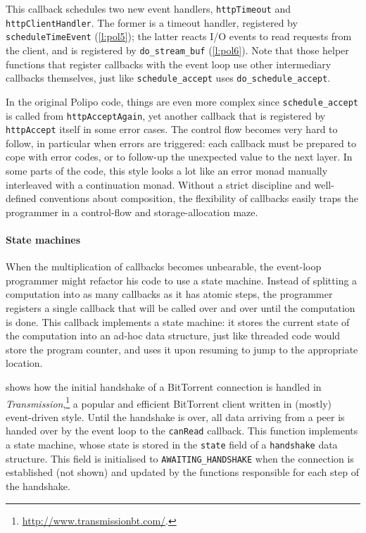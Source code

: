 \documentclass[a4paper]{llncs}
\begin{document}
This callback schedules two new event handlers, \texttt{httpTimeout} and
\texttt{http\-Client\-Handler}.  The former is a timeout handler, registered by
\texttt{schedule\-Time\-Event} (\cref{l:pol5}); the latter reacts I/O events to read requests
from the client, and is registered by \texttt{do\_stream\_buf} (\cref{l:pol6}).  Note that
those helper functions that register callbacks with the event loop use other
intermediary callbacks themselves, just like \texttt{schedule\_accept} uses
\texttt{do\_schedule\_accept}.

In the original Polipo code, things are even more complex since
\texttt{schedule\_\allowbreak accept} is called from \texttt{httpAcceptAgain}, yet another
callback that is registered by \texttt{httpAccept} itself in some error cases.
The control flow becomes very hard to follow, in particular when errors are
triggered: each callback must be prepared to cope with error codes, or to
follow-up the unexpected value to the next layer.  In some parts of the code,
this style looks a lot like an error monad manually interleaved with a
continuation monad.  Without a strict discipline and well-defined conventions
about composition, the flexibility of callbacks easily traps the programmer in a
control-flow and storage-allocation maze.

\paragraph{State machines}

When the multiplication of callbacks becomes unbearable, the
event-loop programmer might refactor his code to use a state machine.
Instead of splitting a computation into as many callbacks as it has atomic
steps, the programmer registers a single callback that will be called over and
over until the computation is done.  This callback implements a state machine:
it stores the current state of the computation into an ad-hoc data structure,
just like threaded code would store the program counter, and uses it upon
resuming to jump to the appropriate location.

 shows how the initial handshake of a BitTorrent
connection is handled in
\emph{Transmission},\footnote{\url{http://www.transmissionbt.com/}.} a popular
and efficient BitTorrent client written in (mostly) event-driven style.  Until
the handshake is over, all data arriving from a peer is handed over by the
event loop to the \texttt{canRead} callback.  This function implements a state
machine, whose state is stored in the \texttt{state} field of a \texttt{handshake}
data structure.  This field is initialised to \texttt{AWAITING\_HANDSHAKE} when
the connection is established (not shown) and updated by the functions
responsible for each step of the handshake.
\end{document}
